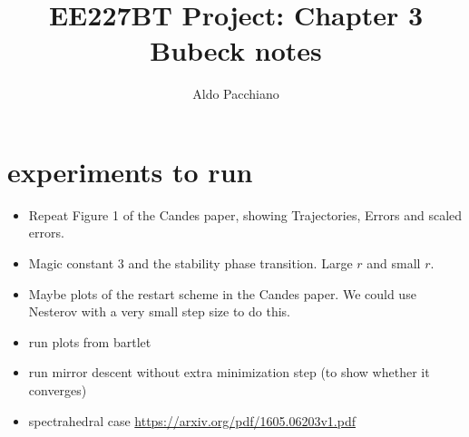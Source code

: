 \documentclass{article}
\title{EE227BT Project:
Chapter 3 Bubeck notes}
\author{Aldo Pacchiano}
\begin{document}
\maketitle


\section{experiments to run}



\begin{itemize}
    \item Repeat Figure 1 of the Candes paper, showing Trajectories, Errors and scaled errors. 
    \item Magic constant 3 and the stability phase transition. Large $r$ and small $r$. 
    \item Maybe plots of the restart scheme in the Candes paper. We could use Nesterov with a very small step size to do this. 
    \item run plots from bartlet
    \item run mirror descent without extra minimization step (to show whether it converges)
    \item spectrahedral case \url{https://arxiv.org/pdf/1605.06203v1.pdf}
\end{itemize}





\end{document}
